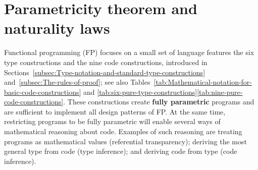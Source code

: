 \begin{comment}
the rules of derivation of the logic the compiler can check out all
these logical rules but the compiler does not know that your logic
is inconsistent maybe and then it will deep have derived an inconsistent
result falsehood from truth for example and that will crash at runtime
now we know that crashing at runtime is not a good outcome so in fact
languages like Oh camel have been studied and for other languages
some subsets of Haskell I believe called safe Haskell have been studied
and it has been shown that they cannot crash and they're the way to
show it mathematically is to use the fact that they are based on a
complete and consistent logic and then all you need to show is that
your compiler does not have some critical bugs that allow it to oversee
that you have not followed the derivation rules of the logic that
is an extremely valuable feature of functional programming languages
that are based on the Curie habit correspondence you can prove their
safety at compile time or at least exclude a large number of possible
bugs and errors certainly these languages are quite large and they
include features that are not covered by the Carey Hart correspondence
type constructors that I have not considered in this tutorial and
those might may not be safe but at least the foundation of these languages
the foundation of the type system will be safe so that is the final
lesson from the great Howard correspondence this concludes the tutorial 
\end{comment}


\chapter{Parametricity theorem and naturality laws\label{app:Proofs-of-naturality-parametricity}}

Functional programming (FP) focuses on a small set of language features
\textemdash{} the six type constructions and the nine code constructions,
introduced in Sections~\ref{subsec:Type-notation-and-standard-type-constructions}
and~\ref{subsec:The-rules-of-proof}; see also Tables~\ref{tab:Mathematical-notation-for-basic-code-constructions}
and \ref{tab:six-pure-type-constructions}\textendash \ref{tab:nine-pure-code-constructions}.
These constructions create \textbf{fully parametric} programs
and are sufficient to implement all design patterns of FP. At the
same time, restricting programs to be fully parametric will enable
several ways of mathematical reasoning about code. Examples of such
reasoning are treating programs as mathematical values (referential
transparency); deriving the most general type from code (type inference);
and deriving code from type (code inference).

